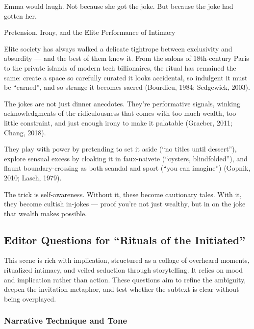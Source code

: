 Emma would laugh.
Not because she got the joke.
But because the joke had gotten her.

\medskip

\begin{HistoricalSidebar}{Pretension, Irony, and the Elite Performance of Intimacy}

  Elite society has always walked a delicate tightrope between exclusivity and absurdity — and the best 
  of them knew it. From the salons of 18th-century Paris to the private islands of modern tech 
  billionaires, the ritual has remained the same: create a space so carefully curated it looks 
  accidental, so indulgent it must be ``earned'', and so strange it becomes sacred (Bourdieu, 1984; Sedgewick, 2003).

  \medskip
  
  The jokes are not just dinner anecdotes. They’re performative signals, winking acknowledgments of the 
  ridiculousness that comes with too much wealth, too little constraint, and just enough irony to 
  make it palatable (Graeber, 2011; Chang, 2018).

  \medskip
  
  They play with power by pretending to set it aside (“no titles until dessert”), explore sensual 
  excess by cloaking it in faux-naivete (“oysters, blindfolded”), and flaunt boundary-crossing as 
  both scandal and sport (“you can imagine”) (Gopnik, 2010; Lasch, 1979). 

  \medskip
  
  The trick is self-awareness. Without it, these become cautionary tales. With it, they become 
  cultish in-jokes — proof you’re not just wealthy, but in on the joke that wealth makes possible.

\end{HistoricalSidebar}



\subsection*{Editor Questions for ``Rituals of the Initiated''}

This scene is rich with implication, structured as a collage of overheard moments, ritualized intimacy, and veiled seduction through storytelling. It relies on mood and implication rather than action. These questions aim to refine the ambiguity, deepen the invitation metaphor, and test whether the subtext is clear without being overplayed.

\subsubsection*{Narrative Technique and Tone}

